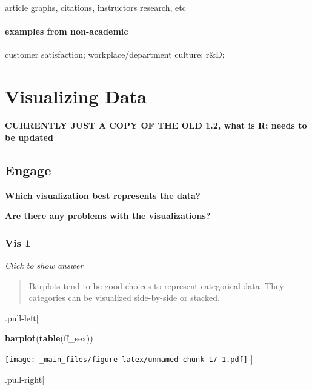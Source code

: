 \documentclass[
]{book}
\newenvironment{Shaded}{\begin{snugshade}}{\end{snugshade}}
\newcommand{\FunctionTok}[1]{\textcolor[rgb]{0.13,0.29,0.53}{\textbf{#1}}}
\newcommand{\NormalTok}[1]{#1}
\newcommand{\SpecialCharTok}[1]{\textcolor[rgb]{0.81,0.36,0.00}{\textbf{#1}}}
\begin{document}
article graphs, citations, instructors research, etc

\hypertarget{examples-from-non-academic}{%
\subsubsection{examples from non-academic}\label{examples-from-non-academic}}

customer satisfaction; workplace/department culture; r\&D;

\hypertarget{visualizing-data}{%
\chapter{Visualizing Data}\label{visualizing-data}}

\textbf{CURRENTLY JUST A COPY OF THE OLD 1.2, what is R; needs to be updated }

\hypertarget{engage-1}{%
\section{Engage}\label{engage-1}}

\textbf{Which visualization best represents the data?}

\textbf{Are there any problems with the visualizations?}

\hypertarget{vis-1}{%
\subsection{Vis 1}\label{vis-1}}

\emph{Click to show answer}

\begin{quote}
Barplots tend to be good choices to represent categorical data. They categories can be visualized side-by-side or stacked.
\end{quote}

.pull-left{[}

\begin{Shaded}
\begin{Highlighting}[]
\FunctionTok{barplot}\NormalTok{(}\FunctionTok{table}\NormalTok{(ff\_sex))}
\end{Highlighting}
\end{Shaded}

\texttt{[image: \_main\_files/figure-latex/unnamed-chunk-17-1.pdf]}
{]}

.pull-right{[}

\begin{Shaded}
\end{Shaded}
\end{document}
